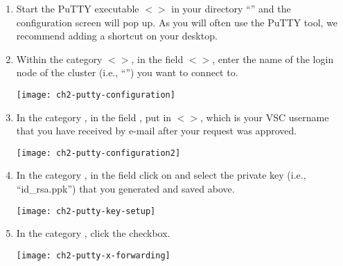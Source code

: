  \begin{enumerate}
    \item  Start the PuTTY executable $<$$>$ in your
      directory ``'' and the
      configuration screen will pop up. As you will often use the PuTTY tool,
      we recommend adding a shortcut on your desktop.
    \item  Within the category $<$$>$, in the field
      $<$$>$, enter the name of the login node of the
      \hpc cluster (i.e., ``\strong{\emph{\loginnode}}'')
      you want to connect to.

      \begin{center}
      \texttt{[image: ch2-putty-configuration]}
      \end{center}

    \item  In the category , in
      the field , put in
      $<$\emph{\userid}$>$, which is your VSC username that you have
      received by e-mail after your request was approved.

      \begin{center}
      \texttt{[image: ch2-putty-configuration2]}
      \end{center}

    \item  In the category , in the
      field  click on
       and select the private key (i.e., ``id\_rsa.ppk'')
      that you generated and saved above.

      \begin{center}
      \texttt{[image: ch2-putty-key-setup]}
      \end{center}

    \item  In the category , click
      the  checkbox.

      \begin{center}
      \texttt{[image: ch2-putty-x-forwarding]}
      \end{center}


\end{enumerate}

